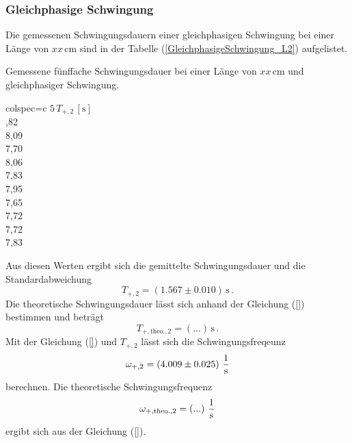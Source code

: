 \subsubsection{Gleichphasige Schwingung}
\label{sec:GleichphasigeSchwingung_LangesPendel}
Die gemessenen Schwingungsdauern einer gleichphasigen Schwingung bei einer Länge von $xx\, \unit{\centi\meter}$ sind in der Tabelle (\ref{GleichphasigeSchwingung_L2})
aufgelistet. 
\begin{table}[H]
  \centering
  \caption{Gemessene fünffache Schwingungsdauer bei einer Länge von $xx\, \unit{\centi\meter}$ und gleichphasiger Schwingung.}
  \label{tab:GleichphasigeSchwingung_L2}
  \begin{tblr}{colspec={c}}
      \toprule
      $5\, T_{+, 2}\,\left[\unit{\second}\right]$\\
      ,82 \\
      8,09 \\
      7,70 \\
      8,06 \\
      7,83 \\
      7,95 \\
      7,65 \\
      7,72 \\
      7,72 \\
      7,83 \\
      \bottomrule
  \end{tblr}
\end{table}
Aus diesen Werten ergibt sich die gemittelte Schwingungsdauer und die Standardabweichung
$$T_{+,2} = \left( 1.567 \pm 0.010 \right)\, \unit{\second}\,.$$
Die theoretische Schwingungsdauer lässt sich anhand der Gleichung (\ref{}) bestimmen und beträgt
$$T_{+,\text{theo.},2} = \left(...\right)\, \unit{\second}\,.$$
Mit der Gleichung (\ref{}) und $T_{+,2}$ lässt sich die Schwingungsfreqeunz
$$\omega_{+,2} = \left( 4.009 \pm 0.025 \right)\, \unit[per-mode=fraction]{\per\second}$$ berechnen. 
Die theoretische Schwingungsfrequenz 
$$\omega_{+,\text{theo.},2} = \left(...\right)\, \unit[per-mode=fraction]{\per\second}$$ ergibt sich aus der Gleichung (\ref{}).
%
%
